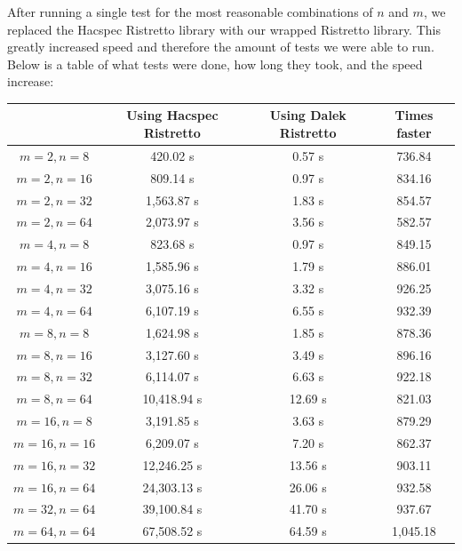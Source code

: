 \documentclass{article}
\begin{document}
After running a single test for the most reasonable combinations of $n$
and $m$,  we replaced the Hacspec Ristretto library with our wrapped
Ristretto library. This greatly increased speed and therefore the
amount of tests we were able to run. Below is a table of what tests
were done, how long they took, and the speed increase:

\begin{center}
\begin{tabular}{ c|c|c|c } 
	& Using Hacspec Ristretto & Using Dalek Ristretto & Times faster\\ \hline\hline
	$m = 2, n = 8 $    & 420.02 s    & 0.57 s  & 736.84 \\ \hline 
	$m = 2, n = 16 $   & 809.14 s    & 0.97 s  & 834.16 \\ \hline 
	$m = 2, n = 32 $   & 1,563.87 s  & 1.83 s  & 854.57 \\ \hline 
	$m = 2, n = 64 $   & 2,073.97 s  & 3.56 s  & 582.57 \\ \hline 
	\hline\hline
	$m = 4, n = 8$    & 823.68 s     & 0.97 s  & 849.15 \\ \hline 
	$m = 4, n = 16$   & 1,585.96 s   & 1.79 s  & 886.01 \\ \hline 
	$m = 4, n = 32$   & 3,075.16 s   & 3.32 s  & 926.25 \\ \hline 
	$m = 4, n = 64$   & 6,107.19 s   & 6.55 s  & 932.39 \\ \hline 
	\hline\hline
	$m = 8, n = 8$    & 1,624.98 s   & 1.85 s  & 878.36 \\ \hline 
	$m = 8, n = 16$   & 3,127.60 s   & 3.49 s  & 896.16 \\ \hline 
	$m = 8, n = 32$   & 6,114.07 s   & 6.63 s  & 922.18 \\ \hline 
	$m = 8, n = 64$   & 10,418.94 s  & 12.69 s & 821.03 \\ \hline 
	\hline\hline
	$m = 16, n = 8$   & 3,191.85 s   & 3.63 s  & 879.29 \\ \hline 
	$m = 16, n = 16$  & 6,209.07 s   & 7.20 s  & 862.37 \\ \hline 
	$m = 16, n = 32$  & 12,246.25 s  & 13.56 s & 903.11 \\ \hline 
	$m = 16, n = 64$  & 24,303.13 s  & 26.06 s & 932.58 \\ \hline 
	\hline\hline
	$m = 32, n = 64$  & 39,100.84 s  & 41.70 s & 937.67 \\ \hline 
	\hline\hline
	$m = 64, n = 64$  & 67,508.52 s  & 64.59 s & 1,045.18 \\ \hline 
\end{tabular}
\end{center}
\end{document}

